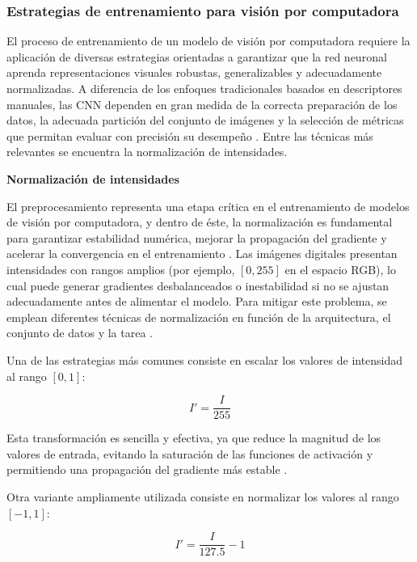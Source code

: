 	\subsubsection{Estrategias de entrenamiento para visión por computadora}
	
	El proceso de entrenamiento de un modelo de visión por computadora requiere la aplicación de diversas estrategias orientadas a garantizar que la red neuronal aprenda representaciones visuales robustas, generalizables y adecuadamente normalizadas. A diferencia de los enfoques tradicionales basados en descriptores manuales, las CNN dependen en gran medida de la correcta preparación de los datos, la adecuada partición del conjunto de imágenes y la selección de métricas que permitan evaluar con precisión su desempeño \cite{krizhevsky2012alexnet}. Entre las técnicas más relevantes se encuentra la normalización de intensidades.
	
	\textbf{Normalización de intensidades}
	
	El preprocesamiento representa una etapa crítica en el entrenamiento de modelos de visión por computadora, y dentro de éste, la normalización es fundamental para garantizar estabilidad numérica, mejorar la propagación del gradiente y acelerar la convergencia en el entrenamiento \cite{goodfellow2016dl}. Las imágenes digitales presentan intensidades con rangos amplios (por ejemplo, $[0,255]$ en el espacio RGB), lo cual puede generar gradientes desbalanceados o inestabilidad si no se ajustan adecuadamente antes de alimentar el modelo. Para mitigar este problema, se emplean diferentes técnicas de normalización en función de la arquitectura, el conjunto de datos y la tarea \cite{kingma2015adam}.
	
	Una de las estrategias más comunes consiste en escalar los valores de intensidad al rango $[0,1]$:
	
	\begin{equation}
		I' = \frac{I}{255}
	\end{equation}
	
	Esta transformación es sencilla y efectiva, ya que reduce la magnitud de los valores de entrada, evitando la saturación de las funciones de activación y permitiendo una propagación del gradiente más estable \cite{goodfellow2016dl}.
	
	Otra variante ampliamente utilizada consiste en normalizar los valores al rango $[-1,1]$:
	
	\begin{equation}
		I' = \frac{I}{127.5} - 1
	\end{equation}
	
